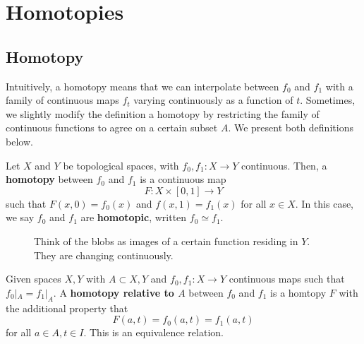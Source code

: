 \section{Homotopies}  

\subsection{Homotopy} 

  Intuitively, a homotopy means that we can interpolate between $f_0$ and $f_1$ with a family of continuous maps $f_t$ varying continuously as a function of $t$. Sometimes, we slightly modify the definition a homotopy by restricting the family of continuous functions to agree on a certain subset $A$. We present both definitions below. 

  \begin{definition}[Homotopy]
    Let $X$ and $Y$ be topological spaces, with $f_0, f_1: X \to Y$ continuous. Then, a \textbf{homotopy} between $f_0$ and $f_1$ is a continuous map 
    \begin{equation}
      F: X \times [0, 1] \to Y
    \end{equation}
    such that $F(x, 0) = f_0 (x)$ and $f(x, 1) = f_1 (x)$ for all $x \in X$. In this case, we say $f_0$ and $f_1$ are \textbf{homotopic}, written $f_0 \simeq f_1$. 

    \begin{figure}[H]
      \centering 
      \caption{Think of the blobs as images of a certain function residing in $Y$. They are changing continuously. }
      \label{fig:single_homotopy_class}
    \end{figure}

    Given spaces $X, Y$ with $A \subset X, Y$ and $f_0, f_1 : X \to Y$ continuous maps such that $f_0 |_A = f_1 |_A$. A \textbf{homotopy relative to $A$} between $f_0$ and $f_1$ is a homtopy $F$ with the additional property that 
    \begin{equation}
      F(a, t) = f_0 (a, t) = f_1 (a, t) 
    \end{equation} 
    for all $a \in A, t \in I$. This is an equivalence relation. 
  \end{definition}
